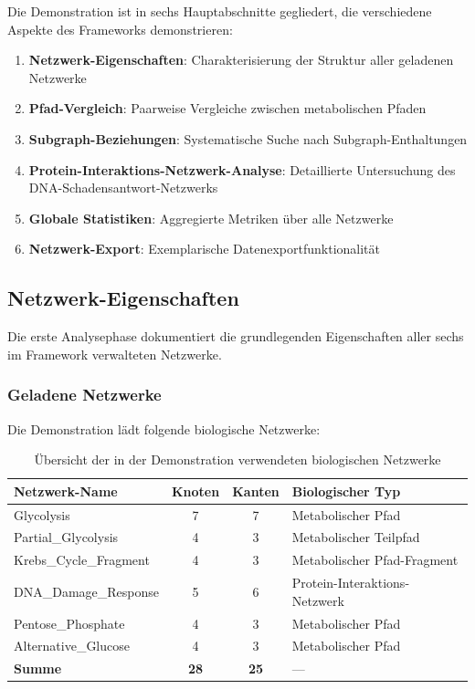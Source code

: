 ﻿\documentclass[a4paper,12pt]{article}
\theoremstyle{definition}
\begin{document}
Die Demonstration ist in sechs Hauptabschnitte gegliedert, die verschiedene Aspekte des Frameworks demonstrieren:

\begin{enumerate}
	\item \textbf{Netzwerk-Eigenschaften}: Charakterisierung der Struktur aller geladenen Netzwerke
	\item \textbf{Pfad-Vergleich}: Paarweise Vergleiche zwischen metabolischen Pfaden
	\item \textbf{Subgraph-Beziehungen}: Systematische Suche nach Subgraph-Enthaltungen
	\item \textbf{Protein-Interaktions-Netzwerk-Analyse}: Detaillierte Untersuchung des DNA-Schadensantwort-Netzwerks
	\item \textbf{Globale Statistiken}: Aggregierte Metriken über alle Netzwerke
	\item \textbf{Netzwerk-Export}: Exemplarische Datenexportfunktionalität
\end{enumerate}

\subsection{Netzwerk-Eigenschaften}

Die erste Analysephase dokumentiert die grundlegenden Eigenschaften aller sechs im Framework verwalteten Netzwerke.

\subsubsection{Geladene Netzwerke}

Die Demonstration lädt folgende biologische Netzwerke:

\begin{table}[h]
	\centering
	\caption{Übersicht der in der Demonstration verwendeten biologischen Netzwerke}
	\label{tab:demo_networks}
	\begin{tabular}{|l|c|c|l|}
		\hline
		\textbf{Netzwerk-Name} & \textbf{Knoten} & \textbf{Kanten} & \textbf{Biologischer Typ} \\
		\hline
		Glycolysis & 7 & 7 & Metabolischer Pfad \\
		Partial\_Glycolysis & 4 & 3 & Metabolischer Teilpfad \\
		Krebs\_Cycle\_Fragment & 4 & 3 & Metabolischer Pfad-Fragment \\
		DNA\_Damage\_Response & 5 & 6 & Protein-Interaktions-Netzwerk \\
		Pentose\_Phosphate & 4 & 3 & Metabolischer Pfad \\
		Alternative\_Glucose & 4 & 3 & Metabolischer Pfad \\
		\hline
		\textbf{Summe} & \textbf{28} & \textbf{25} & --- \\
		\hline
	\end{tabular}
\end{table}
\end{document}
